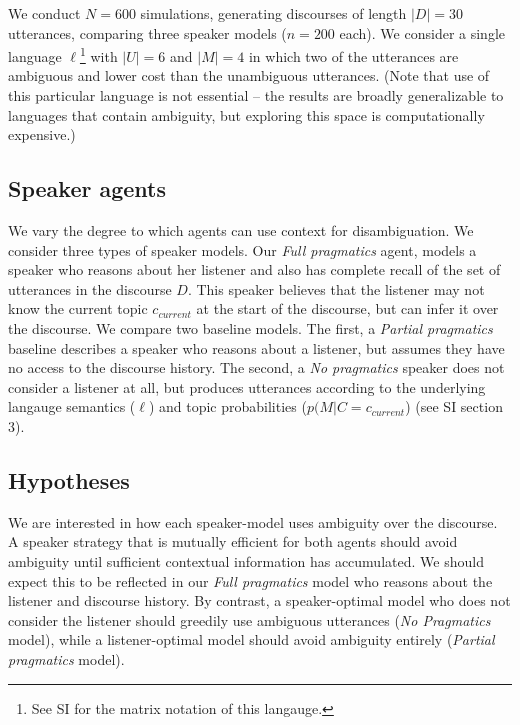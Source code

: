 \documentclass[10pt, letterpaper]{article}
\begin{document}
We conduct \(N=600\) simulations, generating discourses of length
\(|D|=30\) utterances, comparing three speaker models (\(n=200\) each).
We consider a single language
\(\ell\)\footnote{See SI for the matrix notation of this langauge.} with
\(|U|=6\) and \(|M|=4\) in which two of the utterances are ambiguous and
lower cost than the unambiguous utterances. (Note that use of this
particular language is not essential -- the results are broadly
generalizable to languages that contain ambiguity, but exploring this
space is computationally expensive.)\par

\subsection{Speaker agents}\label{speaker-agents}

We vary the degree to which agents can use context for disambiguation.
We consider three types of speaker models. Our \textit{Full pragmatics}
agent, models a speaker who reasons about her listener and also has
complete recall of the set of utterances in the discourse \(D\). This
speaker believes that the listener may not know the current topic
\(c_{current}\) at the start of the discourse, but can infer it over the
discourse. We compare two baseline models. The first, a
\textit{Partial pragmatics} baseline describes a speaker who reasons
about a listener, but assumes they have no access to the discourse
history. The second, a \textit{No pragmatics} speaker does not consider
a listener at all, but produces utterances according to the underlying
langauge semantics (\(\ell\)) and topic probabilities
(\(p(M|C=c_{current}\)) (see SI section 3).\par

\subsection{Hypotheses}\label{hypotheses}

We are interested in how each speaker-model uses ambiguity over the
discourse. A speaker strategy that is mutually efficient for both agents
should avoid ambiguity until sufficient contextual information has
accumulated. We should expect this to be reflected in our
\textit{Full pragmatics} model who reasons about the listener and
discourse history. By contrast, a speaker-optimal model who does not
consider the listener should greedily use ambiguous utterances
(\textit{No Pragmatics} model), while a listener-optimal model should
avoid ambiguity entirely (\textit{Partial pragmatics} model).\par
\end{document}
